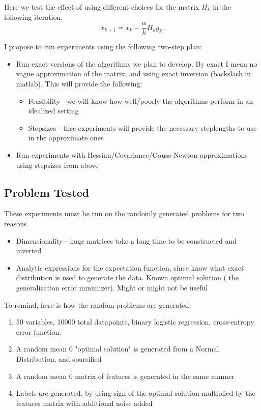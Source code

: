 \documentclass[12pt]{article}
\begin{document}
Here we test the effect of using different choices for the matrix $H_k$ in the following iteration.
\begin{equation}
x_{k+1}= x_k - \frac{\alpha}{k} H_k g_k.
\end{equation}

I propose to run experiments using the following two-step plan:
\begin{itemize}
	\item Run exact versions of the algorithms we plan to develop. By exact I mean no vague approximation of the matrix, and using exact inversion (backslash in matlab). This will provide the following:
			\begin{itemize}
				\item Feasibility - we will know how well/poorly the algorithms perform in an idealized setting
				\item Stepsizes - thse experiments will provide the necessary steplengths to use in the approximate ones
			\end{itemize}
	\item Run experiments with Hessian/Covariance/Gauss-Newton approximations using stepsizes from above
\end{itemize}

\subsection{Problem Tested}
These experiments must be run on the randomly generated problems for two reasons
\begin{itemize}
	\item Dimensionality - huge matrices take a long time to be constructed and inverted
	\item Analytic expressions for the expectation function, since know what exact distribution is used to generate the data. Known optimal solution ( the generalization error minimizer). Might or might not be useful
\end{itemize}

To remind, here is how the random problems are generated:
\begin{enumerate}
	\item 50 variables, 10000 total datapoints, binary logistic regression, cross-entropy error function. 
	\item A random mean 0 "optimal solution" is generated from a Normal Distribution, and sparsified
	\item A random mean 0 matrix of features is generated in the same manner
	\item Labels are generated, by using sign of the optimal solution multiplied by the features matrix with additional noise added
\end{enumerate}
\end{document}
